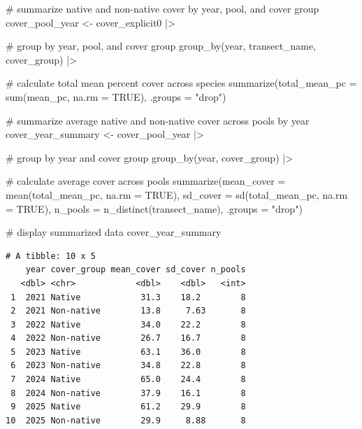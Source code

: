 \documentclass[
  letterpaper,
  DIV=11,
  numbers=noendperiod]{scrartcl}
\newenvironment{Shaded}{\begin{snugshade}}{\end{snugshade}}
\newcommand{\AttributeTok}[1]{\textcolor[rgb]{0.40,0.45,0.13}{#1}}
\newcommand{\CommentTok}[1]{\textcolor[rgb]{0.37,0.37,0.37}{#1}}
\newcommand{\ConstantTok}[1]{\textcolor[rgb]{0.56,0.35,0.01}{#1}}
\newcommand{\FunctionTok}[1]{\textcolor[rgb]{0.28,0.35,0.67}{#1}}
\newcommand{\NormalTok}[1]{\textcolor[rgb]{0.00,0.23,0.31}{#1}}
\newcommand{\OtherTok}[1]{\textcolor[rgb]{0.00,0.23,0.31}{#1}}
\newcommand{\SpecialCharTok}[1]{\textcolor[rgb]{0.37,0.37,0.37}{#1}}
\newcommand{\StringTok}[1]{\textcolor[rgb]{0.13,0.47,0.30}{#1}}
\begin{document}
\begin{Shaded}
\begin{Highlighting}[]
\CommentTok{\# summarize native and non{-}native cover by year, pool, and cover group}
\NormalTok{cover\_pool\_year }\OtherTok{\textless{}{-}}\NormalTok{ cover\_explicit0 }\SpecialCharTok{|\textgreater{}}
  
  \CommentTok{\# group by year, pool, and cover group}
  \FunctionTok{group\_by}\NormalTok{(year, transect\_name, cover\_group) }\SpecialCharTok{|\textgreater{}}
  
  \CommentTok{\# calculate total mean percent cover across species}
  \FunctionTok{summarize}\NormalTok{(}\AttributeTok{total\_mean\_pc =} \FunctionTok{sum}\NormalTok{(mean\_pc, }\AttributeTok{na.rm =} \ConstantTok{TRUE}\NormalTok{),}
            \AttributeTok{.groups =} \StringTok{"drop"}\NormalTok{)}


\CommentTok{\# summarize average native and non{-}native cover across pools by year}
\NormalTok{cover\_year\_summary }\OtherTok{\textless{}{-}}\NormalTok{ cover\_pool\_year }\SpecialCharTok{|\textgreater{}}
  
  \CommentTok{\# group by year and cover group}
  \FunctionTok{group\_by}\NormalTok{(year, cover\_group) }\SpecialCharTok{|\textgreater{}}
  
  \CommentTok{\# calculate average cover across pools}
  \FunctionTok{summarize}\NormalTok{(}\AttributeTok{mean\_cover =} \FunctionTok{mean}\NormalTok{(total\_mean\_pc, }\AttributeTok{na.rm =} \ConstantTok{TRUE}\NormalTok{),}
            \AttributeTok{sd\_cover =} \FunctionTok{sd}\NormalTok{(total\_mean\_pc, }\AttributeTok{na.rm =} \ConstantTok{TRUE}\NormalTok{),}
            \AttributeTok{n\_pools =} \FunctionTok{n\_distinct}\NormalTok{(transect\_name),}
            \AttributeTok{.groups =} \StringTok{"drop"}\NormalTok{)}

\CommentTok{\# display summarized data}
\NormalTok{cover\_year\_summary}
\end{Highlighting}
\end{Shaded}

\begin{verbatim}
# A tibble: 10 x 5
    year cover_group mean_cover sd_cover n_pools
   <dbl> <chr>            <dbl>    <dbl>   <int>
 1  2021 Native            31.3    18.2        8
 2  2021 Non-native        13.8     7.63       8
 3  2022 Native            34.0    22.2        8
 4  2022 Non-native        26.7    16.7        8
 5  2023 Native            63.1    36.0        8
 6  2023 Non-native        34.8    22.8        8
 7  2024 Native            65.0    24.4        8
 8  2024 Non-native        37.9    16.1        8
 9  2025 Native            61.2    29.9        8
10  2025 Non-native        29.9     8.88       8
\end{verbatim}
\end{document}
